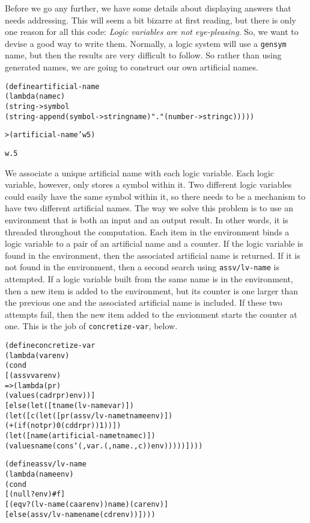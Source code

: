 Before we go any further, we have some details about displaying
answers that needs addressing.  This will seem a bit bizarre at
first reading, but there is only one reason for all this code:
\emph{Logic variables are not eye-pleasing}.  So, we want
to devise a good way to write them.  Normally, a logic system
will use a \texttt{gensym} name, but then the results are
very difficult to follow.  So rather than using generated names,
we are going to construct our own artificial names.

\begin{alltt}
(define artificial-name
  (lambda (name c)
    (string->symbol
      (string-append (symbol->string name) "." (number->string c)))))

> (artificial-name 'w 5)

w.5
\end{alltt}
We associate a unique artificial name with each logic variable.
Each logic variable, however, only stores a symbol within it.  Two
different logic variables could easily have the same symbol within it,
so there needs to be a mechanism to have two different artificial
names.  The way we solve this problem is to use an environment that
is both an input and an output result.  In other words, it is threaded
throughout the computation.  Each item in the environment binds a
logic variable to a pair of an artificial name and a counter.  If the
logic variable is found in the environment, then the associated
artificial name is returned.  If it is not found in the environment,
then a second search using \texttt{assv/lv-name} is attempted.  If a
logic variable built from the same name is in the environment, then a
new item is added to the environment, but its counter is one larger
than the previous one and the associated artificial name is included.
If these two attempts fail, then the new item added to the
envionment starts the counter at one.  This is the job of
\texttt{concretize-var}, below.

\begin{alltt}
(define concretize-var
  (lambda (var env)
    (cond
      [(assv var env)
       => (lambda (pr)
            (values (cadr pr) env))]
      [else (let ([tname (lv-name var)])
              (let ([c (let ([pr (assv/lv-name tname env)])
                         (+ (if (not pr) 0 (cddr pr)) 1))])
                (let ([name (artificial-name tname c)])
                  (values name (cons `(,var . (,name . ,c)) env)))))])))
\end{alltt}
\begin{alltt}
(define assv/lv-name
  (lambda (name env)
    (cond
      [(null? env) #f]
      [(eqv? (lv-name (caar env)) name) (car env)]
      [else (assv/lv-name name (cdr env))])))
\end{alltt}

